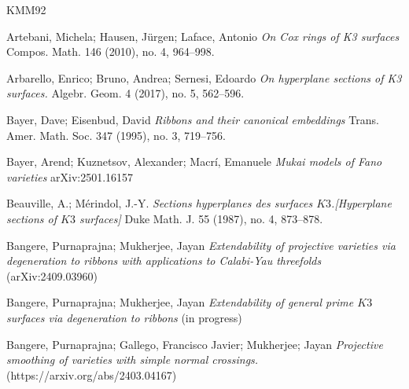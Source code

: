 \documentclass[11pt,twoside]{amsart}
\theoremstyle{plain}
\numberwithin{equation}{section}
\theoremstyle{definition}
\begin{document}










\vspace{0.5cm}


\begin{thebibliography}{KMM92}
\color{black}



Artebani, Michela; Hausen, Jürgen; Laface, Antonio
\emph{On Cox rings of K3 surfaces}
Compos. Math. 146 (2010), no. 4, 964–998.

Arbarello, Enrico; Bruno, Andrea; Sernesi, Edoardo
\emph{On hyperplane sections of K3 surfaces.}
Algebr. Geom. 4 (2017), no. 5, 562–596.

Bayer, Dave; Eisenbud, David
\emph{Ribbons and their canonical embeddings}
Trans. Amer. Math. Soc. 347 (1995), no. 3, 719–756.


Bayer, Arend;  Kuznetsov, Alexander;  Macr\'i, Emanuele 
\emph{Mukai models of Fano varieties}
arXiv:2501.16157

Beauville, A.; Mérindol, J.-Y.
\emph{Sections hyperplanes des surfaces $K3$.[Hyperplane sections of $K3$ surfaces]}
Duke Math. J. 55 (1987), no. 4, 873–878.

Bangere, Purnaprajna; Mukherjee, Jayan  
\emph{Extendability of projective varieties via degeneration to ribbons with applications to Calabi-Yau threefolds} (arXiv:2409.03960)

Bangere, Purnaprajna; Mukherjee, Jayan  
\emph{Extendability of general prime $K3$ surfaces via degeneration to ribbons} (in progress)

 Bangere, Purnaprajna; Gallego, Francisco Javier; Mukherjee; Jayan \emph{Projective smoothing of varieties with simple normal crossings.}(https://arxiv.org/abs/2403.04167)



\end{thebibliography}
\end{document}
